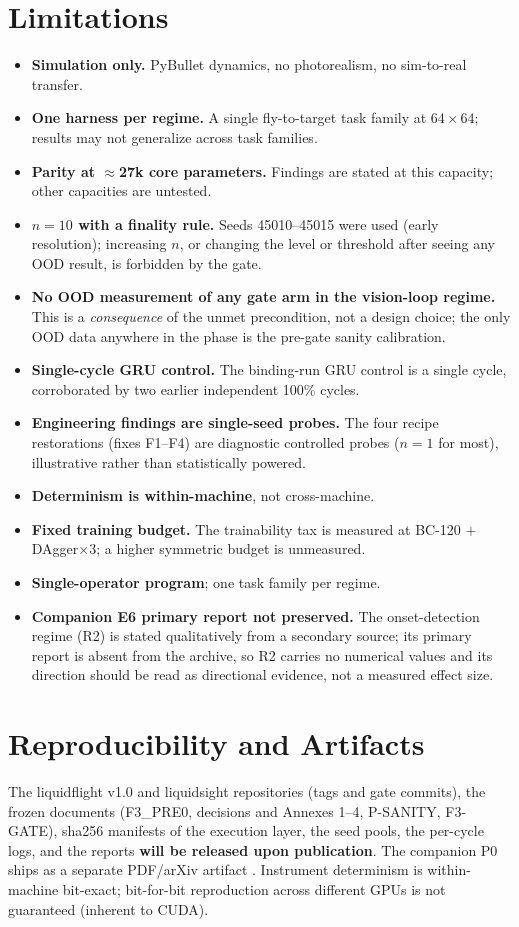 \documentclass[11pt]{article}
\begin{document}
\section{Limitations}
\begin{itemize}
  \item \textbf{Simulation only.} PyBullet dynamics, no photorealism, no sim-to-real transfer.
  \item \textbf{One harness per regime.} A single fly-to-target task family at $64\times64$; results may not generalize across task families.
  \item \textbf{Parity at $\approx$27k core parameters.} Findings are stated at this capacity; other capacities are untested.
  \item \textbf{$n{=}10$ with a finality rule.} Seeds 45010--45015 were used (early resolution); increasing $n$, or changing the level or threshold after seeing any OOD result, is forbidden by the gate.
  \item \textbf{No OOD measurement of any gate arm in the vision-loop regime.} This is a \emph{consequence} of the unmet precondition, not a design choice; the only OOD data anywhere in the phase is the pre-gate sanity calibration.
  \item \textbf{Single-cycle GRU control.} The binding-run GRU control is a single cycle, corroborated by two earlier independent 100\% cycles.
  \item \textbf{Engineering findings are single-seed probes.} The four recipe restorations (fixes F1--F4) are diagnostic controlled probes ($n{=}1$ for most), illustrative rather than statistically powered.
  \item \textbf{Determinism is within-machine}, not cross-machine.
  \item \textbf{Fixed training budget.} The trainability tax is measured at BC-120 $+$ DAgger$\times$3; a higher symmetric budget is unmeasured.
  \item \textbf{Single-operator program}; one task family per regime.
  \item \textbf{Companion E6 primary report not preserved.} The onset-detection regime (R2) is stated qualitatively from a secondary source; its primary report is absent from the archive, so R2 carries no numerical values and its direction should be read as directional evidence, not a measured effect size.
\end{itemize}

\section{Reproducibility and Artifacts}
The liquidflight v1.0 and liquidsight repositories (tags and gate commits), the frozen documents (F3\_PRE0, decisions and Annexes 1--4, P-SANITY, F3-GATE), sha256 manifests of the execution layer, the seed pools, the per-cycle logs, and the reports \textbf{will be released upon publication}. The companion P0 ships as a separate PDF/arXiv artifact \citep{zydziak2026p0}. Instrument determinism is within-machine bit-exact; bit-for-bit reproduction across different GPUs is not guaranteed (inherent to CUDA).
\end{document}
